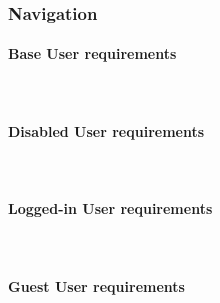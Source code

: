 \subsubsection{Navigation}
\paragraph{Base User requirements}\mbox{}\\

\paragraph{Disabled User requirements}\mbox{}\\

\paragraph{Logged-in User requirements}\mbox{}\\

\paragraph{Guest User requirements}\mbox{}\\

